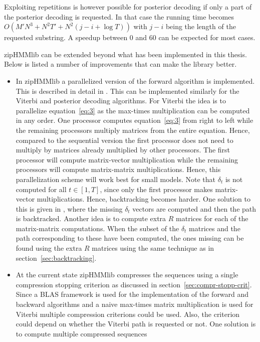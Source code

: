 Exploiting repetitions is however possible for posterior decoding if only a
part of the posterior decoding is requested. In that case the running time
becomes $O(M' N^3 + N^2 T' + N^2 (j - i + \log T))$ with $j - i$ being the
length of the requested substring. A speedup between 0 and 60 can be expected
for most cases.

zipHMMlib can be extended beyond what has been implemented in this thesis. Below
is listed a number of improvements that can make the library better.
\begin{itemize}
\item In zipHMMlib a parallelized version of the forward algorithm is implemented.
  This is described in detail in \citet{sand2014engineering}. This can be
  implemented similarly for the Viterbi and posterior decoding algorithms. For
  Viterbi the idea is to parallelize equation~\eqref{eq:3} as the max-times
  multiplication can be computed in any order. One processor computes
  equation~\eqref{eq:3} from right to left while the remaining processors
  multiply matrices from the entire equation. Hence, compared to the sequential
  version the first processor does not need to multiply by matrices already
  multiplied by other processors. The first processor will compute
  matrix-vector multiplication while the remaining processors will compute
  matrix-matrix multiplications. Hence, this parallelization scheme will work
  best for small models. Note that $\delta_t$ is not computed for all
  $t \in [1, T]$, since only the first processor makes matrix-vector
  multiplications. Hence, backtracking becomes harder. One solution to this is
  given in \citet{sand2014engineering}, where the missing $\delta_t$ vectors
  are computed and then the path is backtracked. Another idea is to compute
  extra $R$ matrices for each of the matrix-matrix computations. When the
  subset of the $\delta_t$ matrices and the path corresponding to these have
  been computed, the ones missing can be found using the extra $R$ matrices
  using the same technique as in section~\ref{sec:backtracking}.
\item At the current state zipHMMlib compresses the sequences using a single
  compression stopping criterion as discussed in
  section~\ref{sec:compr-stopp-crit}. Since a BLAS framework is used for the
  implementation of the forward and backward algorithms and a naive max-times
  matrix multiplication is used for Viterbi multiple compression criterions
  could be used. Also, the criterion could depend on whether the Viterbi path
  is requested or not. One solution is to compute multiple compressed sequences

\end{itemize}
